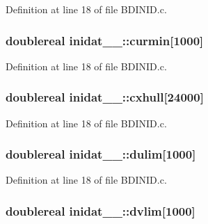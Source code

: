 Definition at line 18 of file B\+D\+I\+N\+I\+D.\+c.

\subsubsection[{\texorpdfstring{curmin}{curmin}}]{\setlength{\rightskip}{0pt plus 5cm}doublereal inidat\+\_\+\_\+\+::curmin\mbox{[}1000\mbox{]}}\hypertarget{structinidat__1___a8768904a6974855f057cbcbd7b9df0a1}{}\label{structinidat__1___a8768904a6974855f057cbcbd7b9df0a1}


Definition at line 18 of file B\+D\+I\+N\+I\+D.\+c.

\subsubsection[{\texorpdfstring{cxhull}{cxhull}}]{\setlength{\rightskip}{0pt plus 5cm}doublereal inidat\+\_\+\_\+\+::cxhull\mbox{[}24000\mbox{]}}\hypertarget{structinidat__1___a1eb40f7014535dab631e6178c37462ef}{}\label{structinidat__1___a1eb40f7014535dab631e6178c37462ef}


Definition at line 18 of file B\+D\+I\+N\+I\+D.\+c.

\subsubsection[{\texorpdfstring{dulim}{dulim}}]{\setlength{\rightskip}{0pt plus 5cm}doublereal inidat\+\_\+\_\+\+::dulim\mbox{[}1000\mbox{]}}\hypertarget{structinidat__1___affa3d4c34e689e56c0daa678c049e81c}{}\label{structinidat__1___affa3d4c34e689e56c0daa678c049e81c}


Definition at line 18 of file B\+D\+I\+N\+I\+D.\+c.

\subsubsection[{\texorpdfstring{dvlim}{dvlim}}]{\setlength{\rightskip}{0pt plus 5cm}doublereal inidat\+\_\+\_\+\+::dvlim\mbox{[}1000\mbox{]}}\hypertarget{structinidat__1___a435a6fd17a4e842c378c86a2545faafc}{}\label{structinidat__1___a435a6fd17a4e842c378c86a2545faafc}


